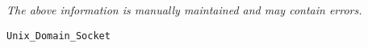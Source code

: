 \label{pkg:unix\_domain\_socket}

{\tiny \it The above information is manually maintained and may contain errors.}
\begin{verbatim}
Unix_Domain_Socket
\end{verbatim}
